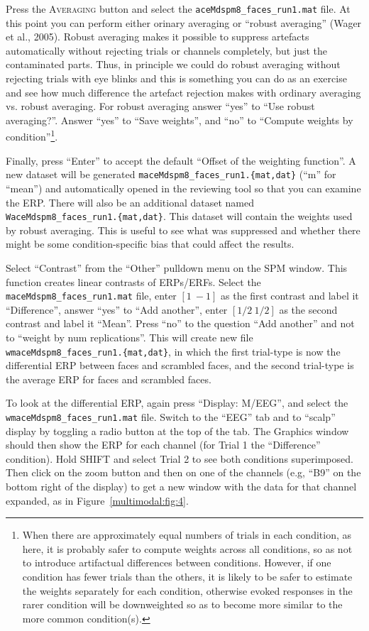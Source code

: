 Press the \textsc{Averaging} button and select the \texttt{aceMdspm8\_faces\_run1.mat} file. At this point you can perform either orinary averaging or ``robust averaging'' (Wager et al., 2005). Robust averaging makes it possible to suppress artefacts automatically without rejecting trials or channels completely, but just the contaminated parts. Thus, in principle we could do robust averaging without rejecting trials with eye blinks and this is something you can do as an exercise and see how much difference the artefact rejection makes with ordinary averaging vs. robust averaging. For robust averaging answer ``yes'' to ``Use robust averaging?''. Answer ``yes'' to ``Save weights'', and ``no'' to ``Compute weights by condition''\footnote{When there are approximately equal numbers of trials in each condition, as here, it is probably safer to compute weights across all conditions, so as not to introduce artifactual differences between conditions. However, if one condition has fewer trials than the others, it is likely to be safer to estimate the weights separately for each condition, otherwise evoked responses in the rarer condition will be downweighted so as to become more similar to the more common condition(s).}.

Finally, press ``Enter'' to accept the default ``Offset of the weighting function''. A new dataset will be generated \texttt{maceMdspm8\_faces\_run1.\{mat,dat\}} (``m'' for ``mean'') and automatically opened in the reviewing tool so that you can examine the ERP. There will also be an additional dataset named \texttt{WaceMdspm8\_faces\_run1.\{mat,dat\}}. This dataset will contain the weights used by robust averaging. This is useful to see what was suppressed and whether there might be some condition-specific bias that could affect the results.

Select ``Contrast'' from the ``Other'' pulldown menu on the SPM window. This function creates linear contrasts of ERPs/ERFs. Select the \texttt{maceMdspm8\_\-faces\_\-run1.mat} file,  enter $[1\: -1]$ as the first contrast and label it ``Difference'', answer ``yes'' to ``Add another'',  enter $[1/2\: 1/2]$ as the second contrast and label it ``Mean''. Press ``no'' to the question ``Add another'' and not to ``weight by num replications''. This will create new file \texttt{wmaceMdspm8\_faces\_run1.\{mat,dat\}}, in which the first trial-type is now the differential ERP between faces and scrambled faces, and the second trial-type is the average ERP for faces and scrambled faces.

To look at the differential ERP, again press ``Display: M/EEG'', and select the \texttt{wmaceMdspm8\_faces\_run1.mat} file. Switch to the ``EEG'' tab and to ``scalp'' display by toggling a radio button at the top of the tab. The Graphics window should then show the ERP for each channel (for Trial 1 the ``Difference'' condition). Hold SHIFT and select Trial 2 to see both conditions superimposed. Then click on the zoom button and then on one of the channels (e.g, ``B9'' on the bottom right of the display) to get a new window with the data for that channel expanded, as in Figure~\ref{multimodal:fig:4}.

